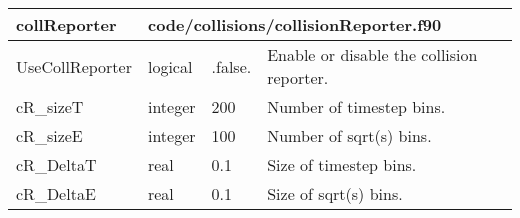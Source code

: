 \documentclass{article}
\begin{document}

\begin{longtable}{llll}
\toprule
\textbf{\large{collReporter}} & \multicolumn{3}{l}{\footnotesize{code/collisions/collisionReporter.f90}}\\*
\midrule
\endfirsthead
\midrule
\endhead
UseCollReporter & \begin{minipage}[t]{2cm}logical\end{minipage} & \begin{minipage}[t]{2cm}.false.\end{minipage} & \begin{minipage}[t]{12cm}Enable or disable the collision reporter.\end{minipage}\\*
\midrule
cR\_sizeT & \begin{minipage}[t]{2cm}integer\end{minipage} & \begin{minipage}[t]{2cm}200\end{minipage} & \begin{minipage}[t]{12cm}Number of timestep bins.\end{minipage}\\*
\midrule
cR\_sizeE & \begin{minipage}[t]{2cm}integer\end{minipage} & \begin{minipage}[t]{2cm}100\end{minipage} & \begin{minipage}[t]{12cm}Number of sqrt(s) bins.\end{minipage}\\*
\midrule
cR\_DeltaT & \begin{minipage}[t]{2cm}real\end{minipage} & \begin{minipage}[t]{2cm}0.1\end{minipage} & \begin{minipage}[t]{12cm}Size of timestep bins.\end{minipage}\\*
\midrule
cR\_DeltaE & \begin{minipage}[t]{2cm}real\end{minipage} & \begin{minipage}[t]{2cm}0.1\end{minipage} & \begin{minipage}[t]{12cm}Size of sqrt(s) bins.\end{minipage}\\*
\bottomrule
\end{longtable}
{ }
\end{document}
